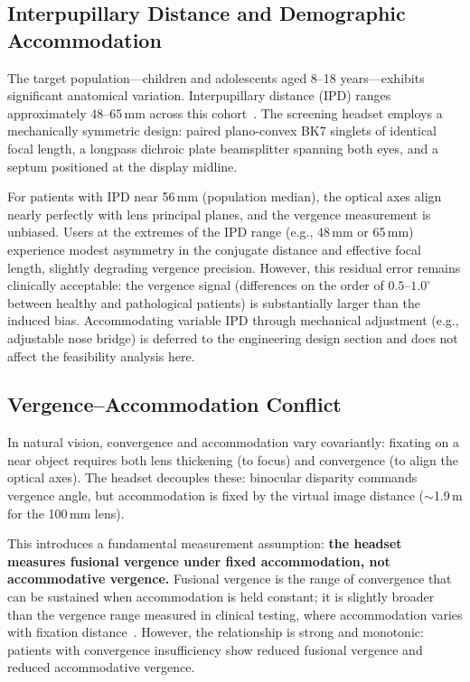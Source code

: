 \subsection{Interpupillary Distance and Demographic Accommodation}
\label{sec:hw-ipd}

The target population---children and adolescents aged 8--18 years---exhibits significant anatomical variation. Interpupillary distance (IPD) ranges approximately 48--65\,mm across this cohort~\cite{maclachlan2002interpupillary}. The screening headset employs a mechanically symmetric design: paired plano-convex BK7 singlets of identical focal length, a longpass dichroic plate beamsplitter spanning both eyes, and a septum positioned at the display midline.

For patients with IPD near 56\,mm (population median), the optical axes align nearly perfectly with lens principal planes, and the vergence measurement is unbiased. Users at the extremes of the IPD range (e.g., 48\,mm or 65\,mm) experience modest asymmetry in the conjugate distance and effective focal length, slightly degrading vergence precision. However, this residual error remains clinically acceptable: the vergence signal (differences on the order of $0.5$--$1.0^{\circ}$ between healthy and pathological patients) is substantially larger than the induced bias. Accommodating variable IPD through mechanical adjustment (e.g., adjustable nose bridge) is deferred to the engineering design section and does not affect the feasibility analysis here.


\subsection{Vergence--Accommodation Conflict}
\label{sec:hw-vac-conflict}

In natural vision, convergence and accommodation vary covariantly: fixating on a near object requires both lens thickening (to focus) and convergence (to align the optical axes). The headset decouples these: binocular disparity commands vergence angle, but accommodation is fixed by the virtual image distance ($\sim$1.9\,m for the 100\,mm lens).

This introduces a fundamental measurement assumption: \textbf{the headset measures fusional vergence under fixed accommodation, not accommodative vergence.} Fusional vergence is the range of convergence that can be sustained when accommodation is held constant; it is slightly broader than the vergence range measured in clinical  testing, where accommodation varies with fixation distance~\cite{horwood2013clinical, schor1992dynamic}. However, the relationship is strong and monotonic: patients with convergence insufficiency show reduced fusional vergence and reduced accommodative vergence.

